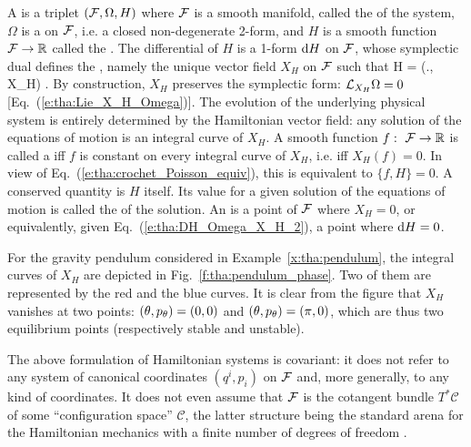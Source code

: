 \begin{prop}
A 
is a triplet $(\mathcal{F},\Omega,H)$ where $\mathcal{F}$ is a smooth
manifold, called the  of the system, $\Omega$ is
a  on $\mathcal{F}$, i.e. a closed non-degenerate
2-form, and $H$ is a smooth function $\mathcal{F} \to \mathbb{R}$ called
the .
The differential of $H$ is a 1-form $\mathrm{d} H$ on
$\mathcal{F}$, whose symplectic dual defines
the ,
namely the unique vector field $X_H$
on $\mathcal{F}$ such that
\be \label{e:tha:DH_Omega_X_H_2}
\Dd H = \Omega(., X_H) .
\ee
By construction, $X_H$ preserves the symplectic
form: $\mathcal{L}_{X_H} \Omega = 0$ [Eq.~(\ref{e:tha:Lie_X_H_Omega})].
The evolution of the underlying physical system is entirely determined
by the Hamiltonian vector field: any solution of the equations of motion
is an integral curve of $X_H$.
A smooth function $f: \ \mathcal{F} \to \mathbb{R}$ is called a
 iff $f$ is constant on every integral curve
of $X_H$, i.e. iff $X_H(f) = 0$. In view of Eq.~(\ref{e:tha:crochet_Poisson_equiv}),
this is equivalent to $\{f,H\} = 0$.
A conserved quantity is $H$ itself. Its value for a given solution of the equations of motion
is called the  of the solution.
An  is a point of $\mathcal{F}$ where $X_H = 0$,
or equivalently, given Eq.~(\ref{e:tha:DH_Omega_X_H_2}), a point where
$\mathrm{d} H = 0$.
\end{prop}

\begin{example}
For the gravity pendulum considered in Example~\ref{x:tha:pendulum},
the integral curves of $X_H$ are depicted in Fig.~\ref{f:tha:pendulum_phase}.
Two of them are
represented by the red and the blue curves. It is clear from the figure
that $X_H$ vanishes at two points: $(\theta,p_\theta) = (0,0)$ and $(\theta,p_\theta) = (\pi,0)$,
which are thus two equilibrium points (respectively stable and unstable).
\end{example}

\begin{remark}
The above formulation of Hamiltonian systems is covariant: it does not
refer to any system of canonical coordinates $(q^i, p_i)$ on $\mathcal{F}$
and, more generally, to any kind of coordinates.
It does not even assume that $\mathcal{F}$ is the cotangent bundle $T^*\mathcal{C}$
of some ``configuration space'' $\mathcal{C}$, the latter structure being the standard
arena for the Hamiltonian mechanics with a finite number of degrees
of freedom \cite{AbrahM78}.
\end{remark}

